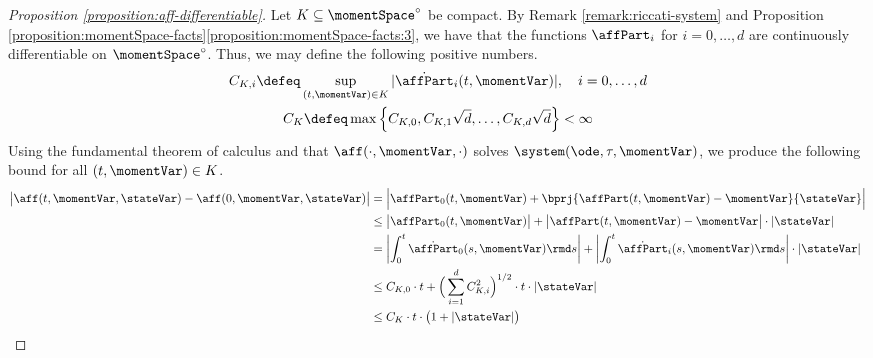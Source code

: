 \begin{proof}[Proposition \ref{proposition:aff-differentiable}]
  \label{proof:proposition:aff-differentiable}
  Let $K \subseteq \momentSpace^\circ$ be compact.
  By Remark \ref{remark:riccati-system} and Proposition \ref{proposition:momentSpace-facts}\ref{proposition:momentSpace-facts:3}, we have that the functions $\affPart_i$ for $i = 0, \ldots, d$ are continuously differentiable on $\momentSpace^\circ$.
  Thus, we may define the following positive numbers.
  \begin{gather}
    C_{K,i} \defeq \sup_{(t, \momentVar) \in K} |\dot\affPart_i(t, \momentVar)|, \quad i = 0, \ldots, d \\
    C_K \defeq \max\Big\{ C_{K,0}, C_{K,1}\sqrt d, \ldots, C_{K,d} \sqrt d \Big\} < \infty
  \end{gather}
  Using the fundamental theorem of calculus and that $\aff(\cdot,\momentVar,\cdot)$ solves $\system(\ode,\tau,\momentVar)$, we produce the following bound for all $(t, \momentVar) \in K$.
  \begin{align}
    \big|\aff(t, \momentVar, \stateVar) - \aff(0, \momentVar, \stateVar)\big| 
    &= \Big| \affPart_0(t, \momentVar) + \bprj{\affPart(t, \momentVar) - \momentVar}{\stateVar} \Big| \\
    &\leq \big|\affPart_0(t,\momentVar)\big| + \big|\affPart(t,\momentVar) - \momentVar\big| \cdot |\stateVar| \\
    &= \left| \int_0^t \dot\affPart_0(s,\momentVar) \rmd s \right|
      + \left| \int_0^t \dot\affPart_i(s,\momentVar) \rmd s \right| \cdot |\stateVar| \\
    &\leq C_{K,0} \cdot t + \Big( \sum_{i=1}^d C_{K,i}^2 \Big)^{1/2} \cdot t \cdot |\stateVar| \\
    &\leq C_K  \cdot t \cdot \big( 1 + |\stateVar| \big)
  \end{align}
\end{proof}
